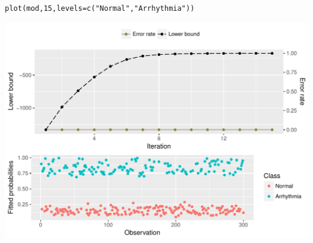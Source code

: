 \documentclass[class=article, crop=false]{standalone}\usepackage[]{graphicx}\usepackage[]{color}
\makeatletter
\def\maxwidth{ %
  \ifdim\Gin@nat@width>\linewidth
    \linewidth
  \else
    \Gin@nat@width
  \fi
}
\newcommand{\hlnum}[1]{\textcolor[rgb]{0.063,0.58,0.627}{#1}}%
\newcommand{\hlstr}[1]{\textcolor[rgb]{0.063,0.58,0.627}{#1}}%
\newcommand{\hlstd}[1]{\textcolor[rgb]{0.196,0.196,0.196}{#1}}%
\newcommand{\hlkwc}[1]{\textcolor[rgb]{0,0.631,0.314}{#1}}%
\newcommand{\hlkwd}[1]{\textcolor[rgb]{0.78,0.227,0.412}{#1}}%
\newenvironment{kframe}{%
 \def\at@end@of@kframe{}%
 \ifinner\ifhmode%
  \def\at@end@of@kframe{\end{minipage}}%
  \begin{minipage}{\columnwidth}%
 \fi\fi%
 \def\FrameCommand##1{\hskip\@totalleftmargin \hskip-\fboxsep
 \colorbox{shadecolor}{##1}\hskip-\fboxsep
     \hskip-\linewidth \hskip-\@totalleftmargin \hskip\columnwidth}%
 \MakeFramed {\advance\hsize-\width
   \@totalleftmargin\z@ \linewidth\hsize
   \@setminipage}}%
 {\par\unskip\endMakeFramed%
 \at@end@of@kframe}
\newenvironment{knitrout}{}{} %
\makeatother
\begin{document}
\begin{knitrout}
\color{fgcolor}\begin{kframe}
\begin{alltt}
\hlkwd{plot}\hlstd{(mod,} \hlnum{15}\hlstd{,} \hlkwc{levels} \hlstd{=} \hlkwd{c}\hlstd{(}\hlstr{"Normal"}\hlstd{,} \hlstr{"Arrhythmia"}\hlstd{))}
\end{alltt}
\end{kframe}

{\centering \includegraphics[width=\maxwidth]{figure/cardiac_plot-1} 

}



\end{knitrout}
\end{document}
